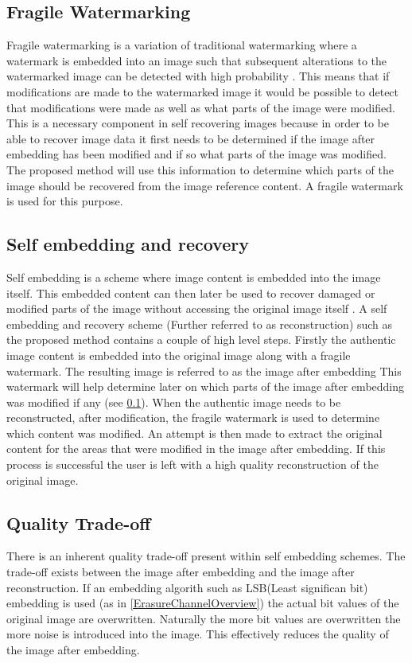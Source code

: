 \documentclass[12pt]{article}
\begin{document}
\subsection{Fragile Watermarking}
\label{introFragWatermarking}
Fragile watermarking is a variation of traditional watermarking where a watermark is embedded into an image such that subsequent alterations to the watermarked image can be detected with high probability \cite{lin1999review}.
This means that if modifications are made to the watermarked image it would be possible to detect that modifications were made as well as what parts of the image were modified.
This is a necessary component in self recovering images because in order to be able to recover image data it first needs to be determined if the image after embedding has been modified and if so what parts of the image was modified.
The proposed method will use this information to determine which parts of the image should be recovered from the image reference content.
A fragile watermark is used for this purpose. 

\subsection{Self embedding and recovery}
\label{introSelfEmbedRecovery}
Self embedding is a scheme where image content is embedded into the image itself. This embedded content can then later be used to recover damaged or modified parts of the image without accessing the original image itself \cite{fridrich1999images}.
A self embedding and recovery scheme (Further referred to as reconstruction) such as the proposed method contains a couple of high level steps.
Firstly the authentic image content is embedded into the original image along with a fragile watermark.
The resulting image is referred to as the image after embedding
This watermark will help determine later on which parts of the image after embedding was modified if any (see \ref{introFragWatermarking}).
When the authentic image needs to be reconstructed, after modification, the fragile watermark is used to determine which content was modified.
An attempt is then made to extract the original content for the areas that were modified in the image after embedding.
If this process is successful the user is left with a high quality reconstruction of the original image.

\subsection{Quality Trade-off}
\label{introQualityTrade}
There is an inherent quality trade-off present within self embedding schemes.
The trade-off exists between the image after embedding and the image after reconstruction.
If an embedding algorith such as LSB(Least significan bit) embedding is used (as in \ref{ErasureChannelOverview}) the actual bit values of the original image are overwritten.
Naturally the more bit values are overwritten the more noise is introduced into the image.
This effectively reduces the quality of the image after embedding.
\end{document}
